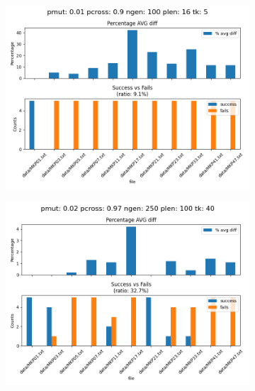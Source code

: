 \begin{figure}[H]

    \centering
    \begin{subfigure}{.3\textwidth}
        \includegraphics[width=\textwidth]{img/tuning/tuning_results_1_90_100_16_5.png}
    \end{subfigure}
    \begin{subfigure}{.3\textwidth}
        \includegraphics[width=\textwidth]{img/tuning/tuning_results_2_97_250_100_40.png}
    \end{subfigure}
    \begin{subfigure}{.3\textwidth}

\end{subfigure}
\end{figure}
